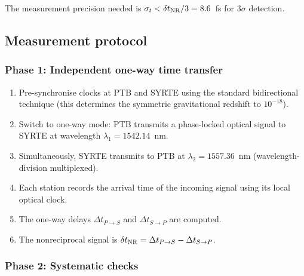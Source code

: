 \documentclass[aps,prl,twocolumn,superscriptaddress,showpacs]{revtex4-2}
\begin{document}
The measurement precision needed is $\sigma_t < \delta t_{\rm NR}/3
= 8.6$~fs for $3\sigma$ detection.

\subsection{Measurement protocol}

\subsubsection{Phase 1: Independent one-way time transfer}

\begin{enumerate}
\item Pre-synchronise clocks at PTB and SYRTE using the standard
      bidirectional technique (this determines the symmetric
      gravitational redshift to $10^{-18}$).
\item Switch to one-way mode: PTB transmits a phase-locked
      optical signal to SYRTE at wavelength $\lambda_1 = 1542.14$~nm.
\item Simultaneously, SYRTE transmits to PTB at
      $\lambda_2 = 1557.36$~nm (wavelength-division multiplexed).
\item Each station records the arrival time of the incoming
      signal using its local optical clock.
\item The one-way delays $\Delta t_{P\to S}$ and $\Delta t_{S\to P}$
      are computed.
\item The nonreciprocal signal is
      $\delta t_{\rm NR} = \Delta t_{P\to S} - \Delta t_{S\to P}$.
\end{enumerate}

\subsubsection{Phase 2: Systematic checks}
\end{document}
